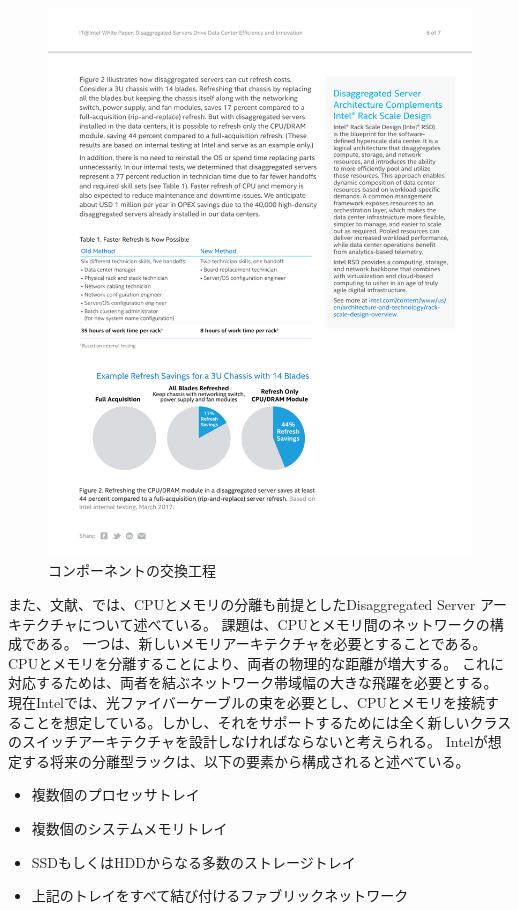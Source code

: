 \documentclass[a4j]{ujarticle}
\begin{document}
\begin{figure}[htbp]
  \centering
  \includegraphics[width=1.0\hsize]{intel-refresh.pdf}
  \caption{コンポーネントの交換工程}
  \label{intel-refresh}
\end{figure}

また、文献\cite{IntelsDisaggregatedServerRack}、\cite{EnhancedBackoffTimerSolutionforGTPCOverloadControl}では、CPUとメモリの分離も前提としたDisaggregated Server アーキテクチャについて述べている。
課題は、CPUとメモリ間のネットワークの構成である。
一つは、新しいメモリアーキテクチャを必要とすることである。
CPUとメモリを分離することにより、両者の物理的な距離が増大する。
これに対応するためは、両者を結ぶネットワーク帯域幅の大きな飛躍を必要とする。
現在Intelでは、光ファイバーケーブルの束を必要とし、CPUとメモリを接続することを想定している。しかし、それをサポートするためには全く新しいクラスのスイッチアーキテクチャを設計しなければならないと考えられる。
Intelが想定する将来の分離型ラックは、以下の要素から構成されると述べている。
\begin{itemize}
  \item 複数個のプロセッサトレイ
  \item 複数個のシステムメモリトレイ
  \item SSDもしくはHDDからなる多数のストレージトレイ
  \item 上記のトレイをすべて結び付けるファブリックネットワーク
\end{itemize}
\end{document}
